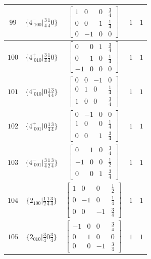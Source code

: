 \documentclass[fleqn,8pt]{jsarticle}
\begin{document}
\begin{longtable}{ccccc}
$ 99 $ & $ \{4^{-}_{\,\,100}|\frac{3}{4} \frac{1}{4} 0\} $ & $ \begin{bmatrix} 1 & 0 & 0 & \frac{3}{4} \\ 0 & 0 & 1 & \frac{1}{4} \\ 0 & -1 & 0 & 0 \end{bmatrix} $ & $ 1 $ & $ 1 $ \\ \hline
$ 100 $ & $ \{4^{+}_{\,\,010}|\frac{3}{4} \frac{1}{4} 0\} $ & $ \begin{bmatrix} 0 & 0 & 1 & \frac{3}{4} \\ 0 & 1 & 0 & \frac{1}{4} \\ -1 & 0 & 0 & 0 \end{bmatrix} $ & $ 1 $ & $ 1 $ \\ \hline
$ 101 $ & $ \{4^{-}_{\,\,010}|0 \frac{1}{4} \frac{3}{4}\} $ & $ \begin{bmatrix} 0 & 0 & -1 & 0 \\ 0 & 1 & 0 & \frac{1}{4} \\ 1 & 0 & 0 & \frac{3}{4} \end{bmatrix} $ & $ 1 $ & $ 1 $ \\ \hline
$ 102 $ & $ \{4^{+}_{\,\,001}|0 \frac{1}{4} \frac{3}{4}\} $ & $ \begin{bmatrix} 0 & -1 & 0 & 0 \\ 1 & 0 & 0 & \frac{1}{4} \\ 0 & 0 & 1 & \frac{3}{4} \end{bmatrix} $ & $ 1 $ & $ 1 $ \\ \hline
$ 103 $ & $ \{4^{-}_{\,\,001}|\frac{3}{4} \frac{1}{2} \frac{3}{4}\} $ & $ \begin{bmatrix} 0 & 1 & 0 & \frac{3}{4} \\ -1 & 0 & 0 & \frac{1}{2} \\ 0 & 0 & 1 & \frac{3}{4} \end{bmatrix} $ & $ 1 $ & $ 1 $ \\ \hline
$ 104 $ & $ \{2{}_{100}|\frac{1}{2} \frac{1}{4} \frac{3}{4}\} $ & $ \begin{bmatrix} 1 & 0 & 0 & \frac{1}{2} \\ 0 & -1 & 0 & \frac{1}{4} \\ 0 & 0 & -1 & \frac{3}{4} \end{bmatrix} $ & $ 1 $ & $ 1 $ \\ \hline
$ 105 $ & $ \{2{}_{010}|\frac{3}{4} 0 \frac{3}{4}\} $ & $ \begin{bmatrix} -1 & 0 & 0 & \frac{3}{4} \\ 0 & 1 & 0 & 0 \\ 0 & 0 & -1 & \frac{3}{4} \end{bmatrix} $ & $ 1 $ & $ 1 $ \\ \hline

\end{longtable}
\end{document}
